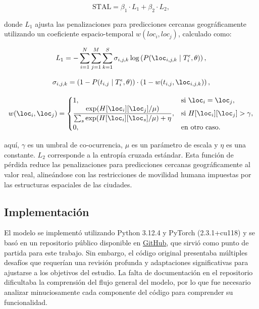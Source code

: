\begin{equation}
\text{STAL} = \beta_1 \cdot L_1 + \beta_2 \cdot L_2,
\label{eq:stal}
\end{equation}

\noindent
donde \(L_1\) ajusta las penalizaciones para predicciones cercanas geográficamente utilizando un coeficiente espacio-temporal \(w(loc_i, loc_j)\), calculado como:

\begin{equation}
    L_1 = - \sum_{i=1}^N \sum_{j=1}^M \sum_{k=1}^S \sigma_{i,j,k} \log \left( P(\loc_{i,j,k} \mid T^\epsilon_i, \theta) \right),
\end{equation}

\begin{equation}
    \sigma_{i,j,k} = \left( 1 - P(t_{i,j} \mid T^\epsilon_i, \theta) \right) \cdot \left( 1 - w(t_{i,j}, \loc_{i,j,k}) \right),
\end{equation}

\begin{equation}
    w(\loc_i, \loc_j) =
    \begin{cases} 
        1, & \text{si } \loc_i = \loc_j, \\
        \displaystyle \frac{\exp(H[\loc_i][\loc_j] / \mu)}{\sum_s \exp(H[\loc_i][\loc_s] / \mu) + \eta}, & \text{si } H[\loc_i][\loc_j] > \gamma, \\
        0, & \text{en otro caso.}
    \end{cases}
\label{eq:w_loc_cases}
\end{equation}

\noindent
aquí, \(\gamma\) es un umbral de co-ocurrencia, \(\mu\) es un parámetro de escala y \(\eta\) es una constante. \(L_2\) corresponde a la entropía cruzada estándar. Esta función de pérdida reduce las penalizaciones para predicciones cercanas geográficamente al valor real, alineándose con las restricciones de movilidad humana impuestas por las estructuras espaciales de las ciudades.

\subsection{Implementación}

El modelo se implementó utilizando Python 3.12.4 y PyTorch (2.3.1+cu118) y se basó en un repositorio público disponible en \href{https://r.search.yahoo.com/_ylt=AwrihnbEpIxnbfEg4Q8PxQt.;_ylu=Y29sbwNiZjEEcG9zAzEEdnRpZAMEc2VjA3Ny/RV=2/RE=1737299269/RO=10/RU=https%3a%2f%2fgithub.com%2fTrajResearch%2fTrajBERT/RK=2/RS=d0fhOp0ellpCiDBR7qVYR9S3bFY-}{GitHub}, que sirvió como punto de partida para este trabajo. Sin embargo, el código original presentaba múltiples desafíos que requerían una revisión profunda y adaptaciones significativas para ajustarse a los objetivos del estudio. La falta de documentación en el repositorio dificultaba la comprensión del flujo general del modelo, por lo que fue necesario analizar minuciosamente cada componente del código para comprender su funcionalidad.

